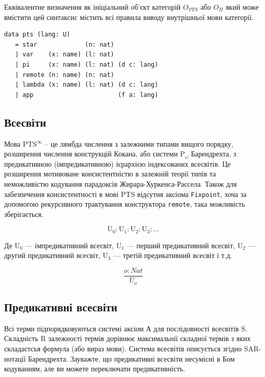 \begin{definition}
\begin{definition}
\begin{definition}
\begin{definition}
Еквівалентне визначення як ініціальний об'єкт категорій $O_{PTS}$ або $O_\Pi$
який може вмістити цей синтаксис містить всі правила виводу
внутрішньої мови категорії.

\begin{lstlisting}[mathescape=true]
data pts (lang: U)
   = star             (n: nat)
   | var    (x: name) (l: nat)
   | pi     (x: name) (l: nat) (d c: lang)
   | remote (n: name) (n: nat)
   | lambda (x: name) (l: nat) (d c: lang)
   | app                       (f a: lang)
\end{lstlisting}


\subsection{Всесвіти}

Мова PTS$^\infty$ -- це лямбда числення з залежними типами вищого порядку,
розширення числення конструкцій Кокана, або системи P$_\omega$ Барендрехта,
з предикативною (імпредикативною) ієрархією індексованих всесвітів.
Це розширення мотивоване консистентністю\cite{Lof75} в залежній теорії типів та
неможливістю кодування парадоксів Жирара-Хуркенса-Рассела. Також для
забезпечення консистентності в мові PTS відсутня аксіома \lstinline{Fixpoint}, хоча
за допомогою рекурсивного трактування конструктора \lstinline{remote},
така можливість зберігається.

$$
    \mathrm{U_0} : \mathrm{U}_1 : \mathrm{U}_2 : \mathrm{U}_3 : ...
$$

Де $\mathrm{U_0}$ --- імпредикативний всесвіт,
   $\mathrm{U_1}$ --- перший предикативний всесвіт,
   $\mathrm{U_2}$ --- другий предикативний всесвіт,
   $\mathrm{U_3}$ --- третій предикативний всесвіт і т.д.

\begin{equation}
\tag{S}
\dfrac
{o : Nat}
{U_o}
\end{equation}

\newpage
\subsection*{Предикативні всесвіти}

Всі терми підпорядковуються системі аксіом А для послідовності всесвітів S.
Складність R залежності термів дорівнює максимальнії складної термів з
яких складаєтсья формула (або вираз мови). Система всесвітів описується
згідно SAR-нотації Барендрехта. Зауважте, що предикативні всесвіти
несумісні в Бом кодуванням, але ви можете переключати предикативність.


\end{definition}
\end{definition}
\end{definition}
\end{definition}
